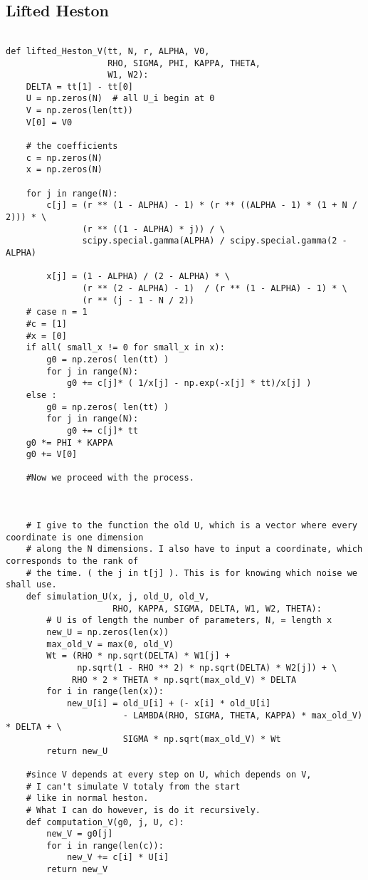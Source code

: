 \subsection{Lifted Heston}
\begin{Verbatim}[fontsize=\tiny]

def lifted_Heston_V(tt, N, r, ALPHA, V0,
                    RHO, SIGMA, PHI, KAPPA, THETA,
                    W1, W2):
    DELTA = tt[1] - tt[0]
    U = np.zeros(N)  # all U_i begin at 0
    V = np.zeros(len(tt))
    V[0] = V0

    # the coefficients
    c = np.zeros(N)
    x = np.zeros(N)

    for j in range(N):
        c[j] = (r ** (1 - ALPHA) - 1) * (r ** ((ALPHA - 1) * (1 + N / 2))) * \
               (r ** ((1 - ALPHA) * j)) / \
               scipy.special.gamma(ALPHA) / scipy.special.gamma(2 - ALPHA)

        x[j] = (1 - ALPHA) / (2 - ALPHA) * \
               (r ** (2 - ALPHA) - 1)  / (r ** (1 - ALPHA) - 1) * \
               (r ** (j - 1 - N / 2))
    # case n = 1
    #c = [1]
    #x = [0]
    if all( small_x != 0 for small_x in x):
        g0 = np.zeros( len(tt) )
        for j in range(N):
            g0 += c[j]* ( 1/x[j] - np.exp(-x[j] * tt)/x[j] )
    else :
        g0 = np.zeros( len(tt) )
        for j in range(N):
            g0 += c[j]* tt
    g0 *= PHI * KAPPA
    g0 += V[0]

    #Now we proceed with the process.



    # I give to the function the old U, which is a vector where every coordinate is one dimension
    # along the N dimensions. I also have to input a coordinate, which corresponds to the rank of
    # the time. ( the j in t[j] ). This is for knowing which noise we shall use.
    def simulation_U(x, j, old_U, old_V,
                     RHO, KAPPA, SIGMA, DELTA, W1, W2, THETA):
        # U is of length the number of parameters, N, = length x
        new_U = np.zeros(len(x))
        max_old_V = max(0, old_V)
        Wt = (RHO * np.sqrt(DELTA) * W1[j] +
              np.sqrt(1 - RHO ** 2) * np.sqrt(DELTA) * W2[j]) + \
             RHO * 2 * THETA * np.sqrt(max_old_V) * DELTA
        for i in range(len(x)):
            new_U[i] = old_U[i] + (- x[i] * old_U[i]
                       - LAMBDA(RHO, SIGMA, THETA, KAPPA) * max_old_V) * DELTA + \
                       SIGMA * np.sqrt(max_old_V) * Wt
        return new_U

    #since V depends at every step on U, which depends on V,
    # I can't simulate V totaly from the start
    # like in normal heston.
    # What I can do however, is do it recursively.
    def computation_V(g0, j, U, c):
        new_V = g0[j]
        for i in range(len(c)):
            new_V += c[i] * U[i]
        return new_V


\end{Verbatim}
